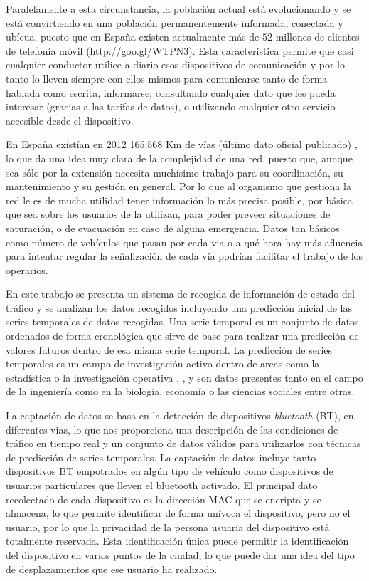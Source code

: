 \documentclass[runningheads]{llncs}
\begin{document}
Paralelamente a esta circunstancia, la población actual está evolucionando y se está convirtiendo
en una población permanentemente informada, conectada y ubícua, puesto que en España existen
actualmente más de $52$ millones de clientes de telefonía móvil
(\url{http://goo.gl/WTPN3}). Esta característica permite que casi cualquier
conductor utilice a diario esos dispositivos de comunicación y por lo tanto lo lleven siempre con
ellos mismos para comunicarse tanto de forma hablada como escrita, informarse, consultando
cualquier dato que les pueda interesar (gracias a las tarifas de datos), o utilizando cualquier
otro servicio accesible desde el dispositivo. 

En España existían en 2012 165.568  Km de vías (último dato oficial publicado)
\cite{DatosTrafico2012}, lo que da una idea muy clara de la complejidad de una red, puesto que,
aunque sea sólo por la extensión necesita muchísimo trabajo para su coordinación, su mantenimiento y
su gestión en general. Por lo que al organismo que gestiona la red le es de mucha
utilidad tener información lo más precisa posible, por básica que sea sobre los usuarios de la
utilizan, para poder preveer situaciones de saturación, o de evacuación en caso de alguna
emergencia. Datos tan básicos como número de vehículos que pasan por cada via o a qué hora hay más
afluencia para intentar regular la señalización de cada vía podrían facilitar el trabajo de los
operarios.

En este trabajo se presenta un sistema de recogida de información de estado del tráfico y se
analizan los datos recogidos incluyendo una predicción inicial de las series temporales de datos
recogidas. Una serie temporal es un conjunto de datos
ordenados de forma cronológica que sirve de base para realizar una predicción de valores futuros
dentro de esa misma serie temporal. La predicción de series temporales es un campo de investigación
activo dentro de areas como la estadística o la investigación operativa \cite{Fildes2008},
\cite{Gooijer25years}, y son datos presentes tanto en el campo de la ingeniería como en la
biología, economía o las ciencias sociales entre otras.

La captación de datos se basa en la detección de dispositivos \textit{bluetooth} (BT),
en diferentes vias, lo que nos proporciona una descripción de las condiciones de tráfico en tiempo
real y un conjunto de datos válidos para utilizarlos con técnicas de predicción de series
temporales. La captación de datos incluye tanto dispositivos BT empotrados en algún tipo de
vehículo como dispositivos de usuarios particulares que lleven el bluetooth activado. El principal
dato recolectado de cada dispositivo es la dirección MAC que se encripta y se almacena, lo que
permite identificar de forma unívoca el dispositivo, pero no el usuario, por lo que la privacidad de
la persona usuaria del dispositivo está totalmente reservada. Esta identificación única puede
permitir la identificación del dispositivo en varios puntos de la ciudad, lo que puede dar una idea
del tipo de desplazamientos que ese usuario ha realizado.
\end{document}
